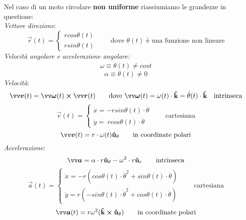 Nel caso di un moto circolare \textbf{non uniforme} riassiumiamo le grandezze in questione:
\\ \emph{Vettore direzione}:
\[
    \vec{r}(t) =
   \begin{cases}
       r cos \theta(t) \\
       r sin \theta(t)
   \end{cases}    
   \qquad \text{dove $\theta(t)$ è una funzione non lineare}
\]
\emph{Velocità angolare e accelerazione angolare:}
\[
\omega \equiv \dot{\theta}(t) \neq cost    
\]
\[
 \alpha \equiv \ddot{\theta}(t) \neq 0    
\]
\emph{Velocità}:
\[
 \vec{v}(t) = \vec{\omega}(t) \cross \vec{r}(t) \qquad \text{dove $\vec{\omega}(t)=\omega(t) \cdot \v{k}
 = \dot{\theta}(t) \cdot \v{k}$} \quad \text{intrinseca}   
\]
\[
 \vec{v}(t) = 
 \begin{cases}
   \dot{x} =  -r sin \theta (t) \cdot \dot{\theta} \\
    \dot{y} = \ r cos \theta (t) \cdot \dot{\theta}
 \end{cases}    
 \qquad \text{cartesiana}
\]
\[
\vec{v}(t)= r \cdot \omega(t) \v{u}_{\theta}
\qquad \text{in coordinate polari}
\]
\emph{Accelerazione}:
\[
    \vec{a} = \alpha  \cdot r  \v{u}_{\theta} - \omega^2 \cdot r  \v{u}_r    \qquad \text{intrinseca} 
\]
\[
    \vec{a}(t) = 
    \begin{cases}
      \ddot{x} =  -r(cos \theta (t) \cdot \dot{\theta}^2 +sin \theta(t) \cdot \ddot{\theta} )\\
       \ddot{y} = r(-sin \theta (t) \cdot \dot{\theta}^2 +cos \theta(t) \cdot \ddot{\theta} )
    \end{cases}    
    \qquad \text{cartesiana}    
\]
\[
\vec{a}(t) = r \omega^2 (\v{k} \cross \v{u}_{\theta})  \qquad \text{in coordinate polari} 
\]